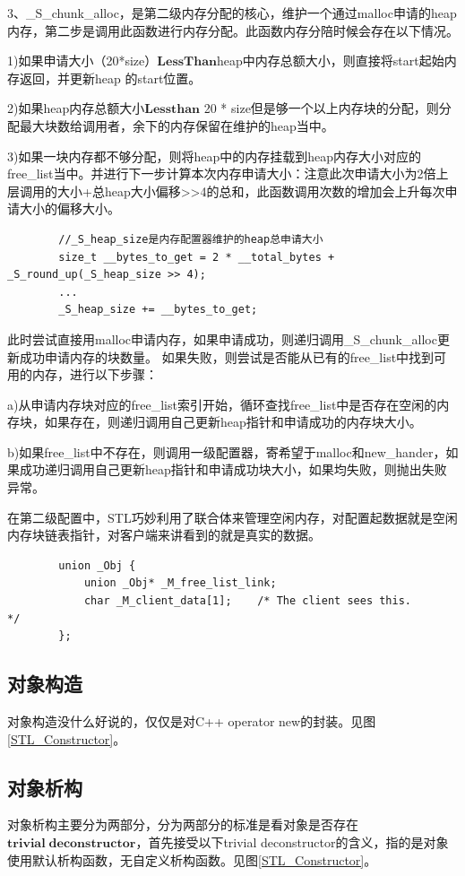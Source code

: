 \documentclass[a4paper,fontset=mac]{ctexart}
\begin{document}
		3、\_S\_chunk\_alloc，是第二级内存分配的核心，维护一个通过malloc申请的heap内存，第二步是调用此函数进行内存分配。此函数内存分陪时候会存在以下情况。
		
		1)如果申请大小（20*size）$\boldsymbol{Less Than}$heap中内存总额大小，则直接将start起始内存返回，并更新heap 的start位置。
		
		2)如果heap内存总额大小$\boldsymbol{Less than}$ 20 * size但是够一个以上内存块的分配，则分配最大块数给调用者，余下的内存保留在维护的heap当中。
		
		3)如果一块内存都不够分配，则将heap中的内存挂载到heap内存大小对应的free\_list当中。并进行下一步计算本次内存申请大小：注意此次申请大小为2倍上层调用的大小+总heap大小偏移>>4的总和，此函数调用次数的增加会上升每次申请大小的偏移大小。
		\begin{lstlisting}
		//_S_heap_size是内存配置器维护的heap总申请大小
		size_t __bytes_to_get = 2 * __total_bytes + _S_round_up(_S_heap_size >> 4); 
		...
		_S_heap_size += __bytes_to_get;
		\end{lstlisting}
		
		此时尝试直接用malloc申请内存，如果申请成功，则递归调用\_S\_chunk\_alloc更新成功申请内存的块数量。
		如果失败，则尝试是否能从已有的free\_list中找到可用的内存，进行以下步骤：
		
		a)从申请内存块对应的free\_list索引开始，循环查找free\_list中是否存在空闲的内存块，如果存在，则递归调用自己更新heap指针和申请成功的内存块大小。
		
		b)如果free\_list中不存在，则调用一级配置器，寄希望于malloc和new\_hander，如果成功递归调用自己更新heap指针和申请成功块大小，如果均失败，则抛出失败异常。
		
		在第二级配置中，STL巧妙利用了联合体来管理空闲内存，对配置起数据就是空闲内存块链表指针，对客户端来讲看到的就是真实的数据。
		\begin{lstlisting}
		union _Obj {
			union _Obj* _M_free_list_link;
			char _M_client_data[1];    /* The client sees this.        */
		};
		\end{lstlisting}
		
		
		\subsection{对象构造}
		对象构造没什么好说的，仅仅是对C++ operator new的封装。见图\ref{STL_Constructor}。
		
		
		
		\subsection{对象析构}
		对象析构主要分为两部分，分为两部分的标准是看对象是否存在$\boldsymbol{trivial\; deconstructor}$，首先接受以下trivial deconstructor的含义，指的是对象使用默认析构函数，无自定义析构函数。见图\ref{STL_Constructor}。
		
\end{document}
